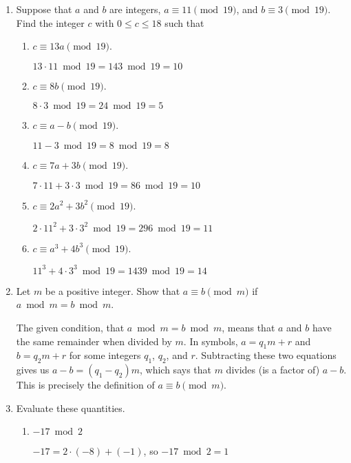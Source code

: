 \documentclass[11pt]{article}
\begin{document}
\begin{enumerate}[label=\textbf{\arabic*.}]
	\item Suppose that $a$ and $b$ are integers, $a \equiv 11 \pmod{19}$, and $b \equiv 3 \pmod{19}$. Find the integer $c$ with $0 \leq c \leq 18$ such that
	
	\begin{enumerate}[label=\textbf{\alph*)}]
		\item $c \equiv 13a \pmod{19}$.
		
		$13 \cdot 11 \bmod 19 = 143 \bmod 19 = 10$
		
		\item $c \equiv 8b \pmod{19}$.
		
		$8 \cdot 3 \bmod 19 = 24 \bmod 19 = 5$
		
		\item $c \equiv a - b \pmod{19}$.
		
		$11 - 3 \bmod 19 = 8 \bmod 19 = 8$
		
		\item $c \equiv 7a + 3b \pmod{19}$.
		
		$7 \cdot 11 + 3 \cdot 3 \bmod 19 = 86 \bmod 19 = 10$
		
		\item $c \equiv 2a^2 + 3b^2 \pmod{19}$.
		
		$2 \cdot 11^2 + 3 \cdot 3^2 \bmod 19 = 296 \bmod 19 = 11$
		
		\item $c \equiv a^3 + 4b^3 \pmod{19}$.
		
		$11^3 + 4 \cdot 3^3 \bmod 19 = 1439 \bmod 19 = 14$
	\end{enumerate}

	\item Let $m$ be a positive integer. Show that $a \equiv b \pmod{m}$ if $a \bmod m = b \bmod m$.
	
	The given condition, that  $a \bmod m = b \bmod m$, means that $a$ and $b$ have the same remainder when divided by $m$. In symbols, $a = q_1m + r$ and $b = q_2m + r$ for some integers $q_1$, $q_2$, and $r$. Subtracting these two equations gives us $a - b = (q_1 - q_2)m$, which says that $m$ divides (is a factor of) $a - b$. This is precisely the definition of $a \equiv b \pmod{m}$.
	
	\item Evaluate these quantities.
	
	\begin{enumerate}[label=\textbf{\alph*)}]
		\item $-17 \bmod 2$
		
		$-17 = 2 \cdot (-8) + (-1)$, so $-17 \bmod 2 = 1$
		

\end{enumerate}
\end{enumerate}
\end{document}
